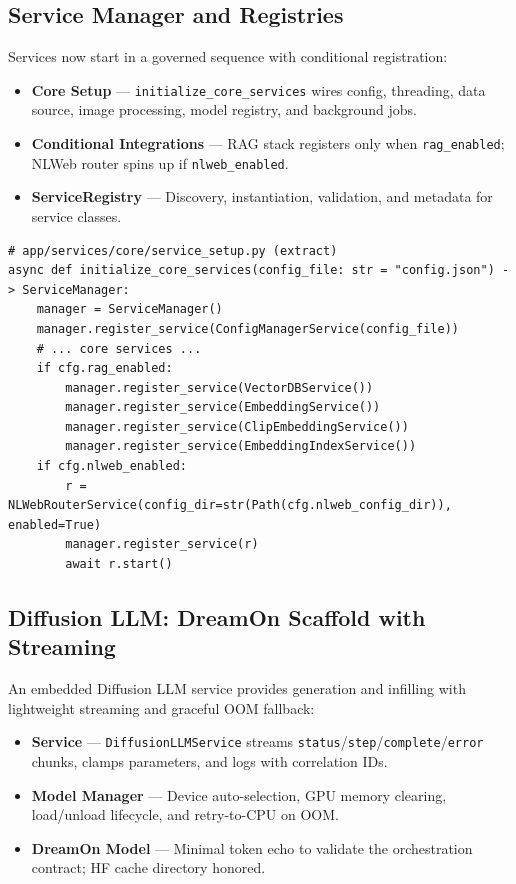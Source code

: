 \documentclass[11pt]{article}
\begin{document}
\subsection{Service Manager and Registries}

Services now start in a governed sequence with conditional registration:

\begin{itemize}
  \item \textbf{Core Setup} — \texttt{initialize\_core\_services} wires config, threading, data source, image processing, model registry, and background jobs.
  \item \textbf{Conditional Integrations} — RAG stack registers only when \texttt{rag\_enabled}; NLWeb router spins up if \texttt{nlweb\_enabled}.
  \item \textbf{ServiceRegistry} — Discovery, instantiation, validation, and metadata for service classes.
\end{itemize}

\begin{lstlisting}[style=python]
# app/services/core/service_setup.py (extract)
async def initialize_core_services(config_file: str = "config.json") -> ServiceManager:
    manager = ServiceManager()
    manager.register_service(ConfigManagerService(config_file))
    # ... core services ...
    if cfg.rag_enabled:
        manager.register_service(VectorDBService())
        manager.register_service(EmbeddingService())
        manager.register_service(ClipEmbeddingService())
        manager.register_service(EmbeddingIndexService())
    if cfg.nlweb_enabled:
        r = NLWebRouterService(config_dir=str(Path(cfg.nlweb_config_dir)), enabled=True)
        manager.register_service(r)
        await r.start()
\end{lstlisting}

\subsection{Diffusion LLM: DreamOn Scaffold with Streaming}

An embedded Diffusion LLM service provides generation and infilling with lightweight streaming and graceful OOM fallback:

\begin{itemize}
  \item \textbf{Service} — \texttt{DiffusionLLMService} streams \texttt{status}/\texttt{step}/\texttt{complete}/\texttt{error} chunks, clamps parameters, and logs with correlation IDs.
  \item \textbf{Model Manager} — Device auto-selection, GPU memory clearing, load/unload lifecycle, and retry-to-CPU on OOM.
  \item \textbf{DreamOn Model} — Minimal token echo to validate the orchestration contract; HF cache directory honored.
\end{itemize}
\end{document}
